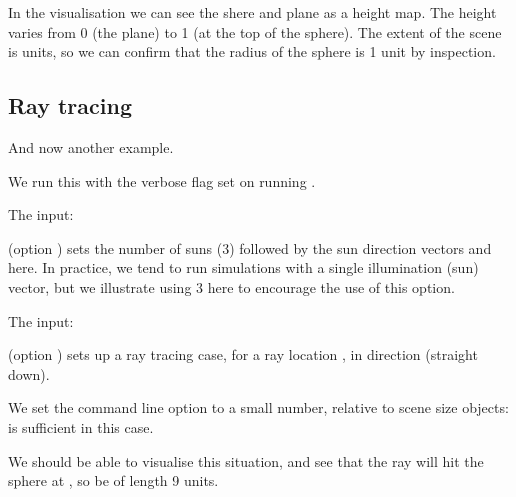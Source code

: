 \documentclass[letterpaper,10pt,english]{sphinxmanual}
\begin{document}
In the visualisation we can see the shere and plane as a height map. The height varies from 0 (the plane) to 1 (at the top of the sphere). The extent of the scene is  units, so we can confirm that the radius of the sphere is 1 unit by inspection.


\subsection{Ray tracing}
\label{\detokenize{RATstart:Ray-tracing}}
And now another example.

We run this with the verbose flag set on running .

The input:

\begin{sphinxVerbatim}[commandchars=\\\{\}]
          
\end{sphinxVerbatim}

(option ) sets the number of suns (3) followed by the sun direction vectors   and  here. In practice, we tend to run simulations with a single illumination (sun) vector, but we illustrate using 3 here to encourage the use of this option.

The input:

\begin{sphinxVerbatim}[commandchars=\\\{\}]
      
\end{sphinxVerbatim}

(option ) sets up a ray tracing case, for a ray  location , in direction  (straight down).

We set the  command line option to a small number, relative to scene size objects:  is sufficient in this case.

We should be able to visualise this situation, and see that the ray will hit the sphere at , so be of length 9 units.
\end{document}
